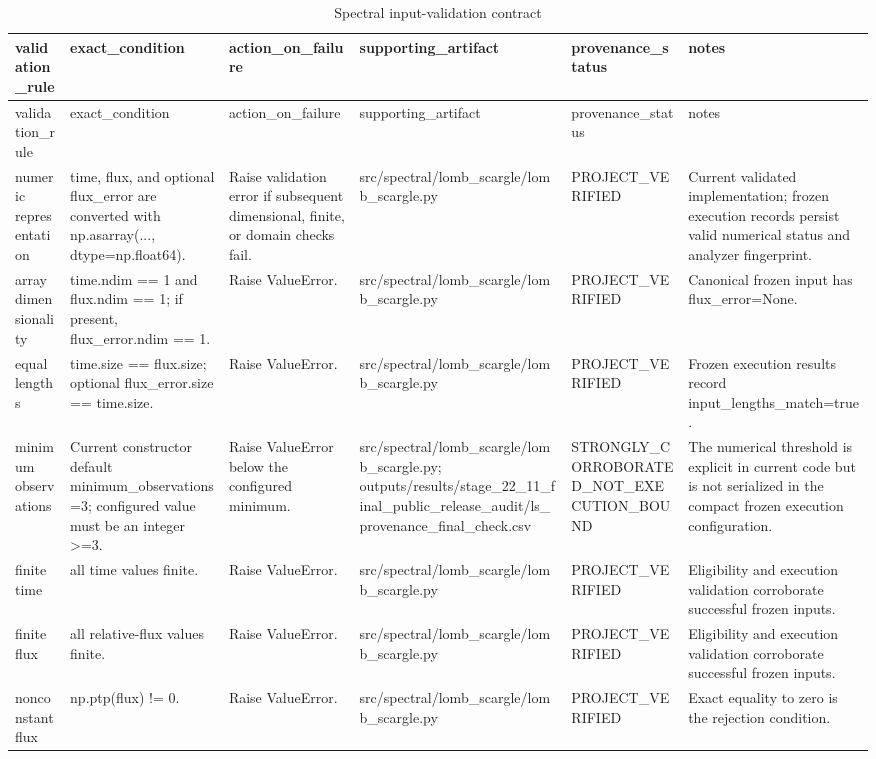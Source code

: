 \begin{longtable}{llllll}
\caption{Spectral input-validation contract}\\
\toprule
validation\_rule & exact\_condition & action\_on\_failure & supporting\_artifact & provenance\_status & notes \\
\midrule
\endfirsthead
\toprule
validation\_rule & exact\_condition & action\_on\_failure & supporting\_artifact & provenance\_status & notes \\
\midrule
\endhead
numeric representation & time, flux, and optional flux\_error are converted with np.asarray(..., dtype=np.float64). & Raise validation error if subsequent dimensional, finite, or domain checks fail. & src/spectral/lomb\_scargle/lomb\_scargle.py & PROJECT\_VERIFIED & Current validated implementation; frozen execution records persist valid numerical status and analyzer fingerprint. \\
array dimensionality & time.ndim == 1 and flux.ndim == 1; if present, flux\_error.ndim == 1. & Raise ValueError. & src/spectral/lomb\_scargle/lomb\_scargle.py & PROJECT\_VERIFIED & Canonical frozen input has flux\_error=None. \\
equal lengths & time.size == flux.size; optional flux\_error.size == time.size. & Raise ValueError. & src/spectral/lomb\_scargle/lomb\_scargle.py & PROJECT\_VERIFIED & Frozen execution results record input\_lengths\_match=true. \\
minimum observations & Current constructor default minimum\_observations=3; configured value must be an integer >=3. & Raise ValueError below the configured minimum. & src/spectral/lomb\_scargle/lomb\_scargle.py; outputs/results/stage\_22\_11\_final\_public\_release\_audit/ls\_provenance\_final\_check.csv & STRONGLY\_CORROBORATED\_NOT\_EXECUTION\_BOUND & The numerical threshold is explicit in current code but is not serialized in the compact frozen execution configuration. \\
finite time & all time values finite. & Raise ValueError. & src/spectral/lomb\_scargle/lomb\_scargle.py & PROJECT\_VERIFIED & Eligibility and execution validation corroborate successful frozen inputs. \\
finite flux & all relative-flux values finite. & Raise ValueError. & src/spectral/lomb\_scargle/lomb\_scargle.py & PROJECT\_VERIFIED & Eligibility and execution validation corroborate successful frozen inputs. \\
nonconstant flux & np.ptp(flux) != 0. & Raise ValueError. & src/spectral/lomb\_scargle/lomb\_scargle.py & PROJECT\_VERIFIED & Exact equality to zero is the rejection condition. \\

\end{longtable}
